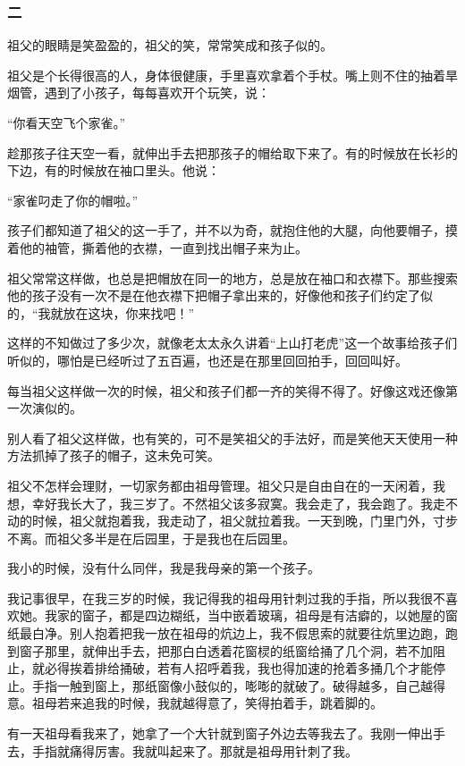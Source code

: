 \subsubsection*{二}
\par 祖父的眼睛是笑盈盈的，祖父的笑，常常笑成和孩子似的。
\par 祖父是个长得很高的人，身体很健康，手里喜欢拿着个手杖。嘴上则不住的抽着旱烟管，遇到了小孩子，每每喜欢开个玩笑，说：
\par “你看天空飞个家雀。”
\par 趁那孩子往天空一看，就伸出手去把那孩子的帽给取下来了。有的时候放在长衫的下边，有的时候放在袖口里头。他说：
\par “家雀叼走了你的帽啦。”
\par 孩子们都知道了祖父的这一手了，并不以为奇，就抱住他的大腿，向他要帽子，摸着他的袖管，撕着他的衣襟，一直到找出帽子来为止。
\par 祖父常常这样做，也总是把帽放在同一的地方，总是放在袖口和衣襟下。那些搜索他的孩子没有一次不是在他衣襟下把帽子拿出来的，好像他和孩子们约定了似的，“我就放在这块，你来找吧！”
\par 这样的不知做过了多少次，就像老太太永久讲着“上山打老虎”这一个故事给孩子们听似的，哪怕是已经听过了五百遍，也还是在那里回回拍手，回回叫好。
\par 每当祖父这样做一次的时候，祖父和孩子们都一齐的笑得不得了。好像这戏还像第一次演似的。
\par 别人看了祖父这样做，也有笑的，可不是笑祖父的手法好，而是笑他天天使用一种方法抓掉了孩子的帽子，这未免可笑。
\par 祖父不怎样会理财，一切家务都由祖母管理。祖父只是自由自在的一天闲着，我想，幸好我长大了，我三岁了。不然祖父该多寂寞。我会走了，我会跑了。我走不动的时候，祖父就抱着我，我走动了，祖父就拉着我。一天到晚，门里门外，寸步不离。而祖父多半是在后园里，于是我也在后园里。
\par 我小的时候，没有什么同伴，我是我母亲的第一个孩子。
\par 我记事很早，在我三岁的时候，我记得我的祖母用针刺过我的手指，所以我很不喜欢她。我家的窗子，都是四边糊纸，当中嵌着玻璃，祖母是有洁癖的，以她屋的窗纸最白净。别人抱着把我一放在祖母的炕边上，我不假思索的就要往炕里边跑，跑到窗子那里，就伸出手去，把那白白透着花窗棂的纸窗给捅了几个洞，若不加阻止，就必得挨着排给捅破，若有人招呼着我，我也得加速的抢着多捅几个才能停止。手指一触到窗上，那纸窗像小鼓似的，嘭嘭的就破了。破得越多，自己越得意。祖母若来追我的时候，我就越得意了，笑得拍着手，跳着脚的。
\par 有一天祖母看我来了，她拿了一个大针就到窗子外边去等我去了。我刚一伸出手去，手指就痛得厉害。我就叫起来了。那就是祖母用针刺了我。
